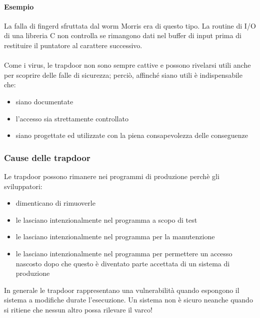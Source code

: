 \paragraph{Esempio} 
La falla di fingerd sfruttata dal worm Morris era di questo tipo. La routine di I/O di una libreria C non controlla se rimangono dati nel buffer di input prima di restituire il puntatore al carattere successivo.\\ \\
Come i virus, le trapdoor non sono sempre cattive e possono rivelarsi utili anche per scoprire delle falle di sicurezza; perciò, affinché siano utili è indispensabile che:
\begin{itemize}
	\item siano documentate
	\item l'accesso sia strettamente controllato
	\item siano progettate ed utilizzate con la piena consapevolezza delle conseguenze
\end{itemize}

\subsubsection{Cause delle trapdoor}
Le trapdoor possono rimanere nei programmi di produzione perchè gli sviluppatori:
\begin{itemize}
	\item dimenticano di rimuoverle
	\item le lasciano intenzionalmente nel programma a scopo di test
	\item le lasciano intenzionalmente nel programma per la manutenzione
	\item le lasciano intenzionalmente nel programma per permettere un accesso nascosto dopo che questo è diventato parte accettata di un sistema di produzione
\end{itemize}
In generale le trapdoor rappresentano una vulnerabilità quando espongono il sistema a modifiche durate l'esecuzione. Un sistema non è sicuro neanche quando si ritiene che nessun altro possa rilevare il varco!
